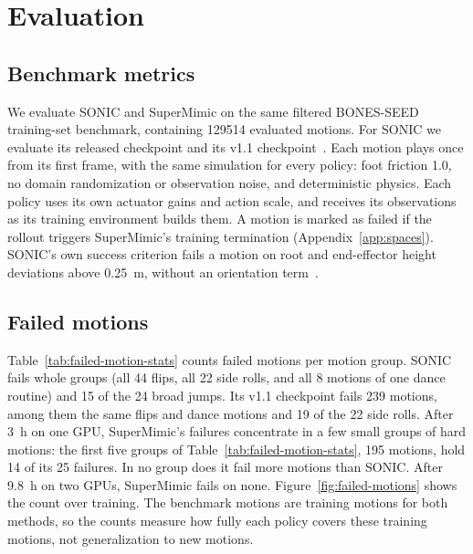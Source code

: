 \section{Evaluation}
\label{app:eval}
\subsection{Benchmark metrics}

We evaluate SONIC and SuperMimic on the same filtered BONES-SEED training-set
benchmark, containing \num{129514} evaluated motions. For SONIC we evaluate its
released checkpoint and its v1.1
checkpoint~\citep{luo2025sonic}. Each motion plays once from its first frame,
with the same simulation for every policy: foot friction 1.0, no domain
randomization or observation noise, and deterministic physics. Each policy uses
its own actuator gains and action scale, and receives its observations as its
training environment builds them. A motion is marked as failed if the rollout
triggers SuperMimic's training termination (Appendix~\ref{app:spaces}). SONIC's own success criterion
fails a motion on root and end-effector height deviations above \qty{0.25}{\metre}, without
an orientation term~\citep{luo2025sonic}.

\subsection{Failed motions}

Table~\ref{tab:failed-motion-stats} counts failed motions per motion group. SONIC fails whole groups (all 44 flips, all 22 side rolls, and all 8 motions of one dance routine) and 15 of the 24 broad jumps. Its v1.1 checkpoint fails 239 motions, among them the same flips and dance motions and 19 of the 22 side rolls. After \qty{3}{\hour} on one GPU, SuperMimic's failures concentrate in a few small groups of hard motions: the first five groups of Table~\ref{tab:failed-motion-stats}, 195 motions, hold 14 of its 25 failures. In no group does it fail more motions than SONIC. After \qty{9.8}{\hour} on two GPUs, SuperMimic fails on none. Figure~\ref{fig:failed-motions} shows the count over training. The benchmark motions are training motions for both methods, so the counts measure how fully each policy covers these training motions, not generalization to new motions.

